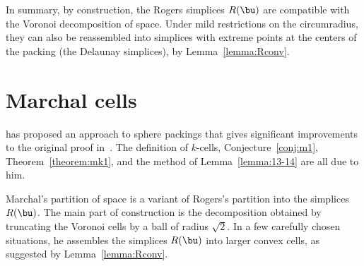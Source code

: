 In summary,
by construction, the Rogers simplices $R(\bu)$  are
compatible with the Voronoi decomposition of space.  Under mild
restrictions on the circumradius, they can also be reassembled into
simplices with extreme points at the centers of the packing (the Delaunay
simplices), by Lemma~\ref{lemma:Rconv}.
%
%



\section{Marchal cells}

\cite{marchal:2008} has proposed an approach to sphere packings
 that gives significant improvements to the original proof
in~\cite{Hales:2006:DCG}.  The definition of $k$-cells,
Conjecture~\ref{conj:m1}, Theorem~\ref{theorem:mk1}, and the method of
Lemma~\ref{lemma:13-14} are all due to him.  
%


Marchal's partition of space is a variant of Rogers's partition into
the simplices $R(\bu)$.  The main part of construction is the
decomposition obtained by truncating the Voronoi cells by a ball of
radius $\sqrt2$.  In a few carefully chosen situations, he assembles
the simplices $R(\bu)$ into larger convex cells, as suggested by
Lemma~\ref{lemma:Rconv}.


